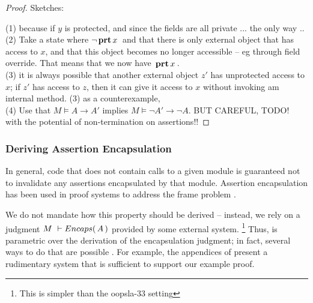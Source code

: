\begin{proof} Sketches:

(1) because if $y$ is protected, and since the fields are all private ... the only way .. 
\\
(2) Take a state where $\neg{\ensuremath{\, \mathbf{prt}}\, x\, }$ and that there is only external object that has access to $x$, and that this object becomes no longer accessible -- eg through field override. That means that we now have  ${\, \mathbf{prt}\, x\, }$.
\\
(3) it is always possible that another external object $z'$ has unprotected access to $x$; if $z'$ has access to $z$, then it can give it access to $x$ without invoking am internal method. (3) as a counterexample, 
\\
(4) Use that $M \vDash A \rightarrow A'$ implies $M \vDash \neg A'  \rightarrow \neg  A$. BUT CAREFUL, TODO! with the potential of non-termination on assertions!!
\end{proof}

\subsubsection{Deriving  Assertion Encapsulation}

{In general},  code that does not contain 
calls to a {given} module is guaranteed not to invalidate any assertions encapsulated by that module.
 Assertion encapsulation has been used in proof systems to {address}   the  {frame} problem
 \cite{objInvars,encaps}. 

We  do not mandate how this property should be derived -- instead, we rely on a judgment 
$M\ \vdash  \encaps{A}$ provided by some external system. \footnote{This is simpler than the oopsla-33 setting}
Thus, \SpecLang is parametric over the derivation of the encapsulation
     judgment; in fact, several ways to do that are possible \cite{TAME2003,ownEncaps,objInvars}. For example,
 the appendices of
    \cite{necessityFull} present a 
    rudimentary system that is sufficient to support our example
    proof.  



